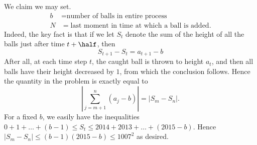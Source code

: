 \documentclass[11pt]{scrartcl}
\begin{document}
We claim we may set.
\begin{align*}
  b &= \text{number of balls in entire process} \\
  N &= \text{last moment in time at which a ball is added}.
\end{align*}
Indeed, the key fact is that if we let $S_t$ denote
the sum of the height of all the balls just after time $t+\half$, then
\[ S_{t+1} - S_t = a_{t+1} - b \]
After all, at each time step $t$, the caught ball is thrown to height $a_t$,
and then all balls have their height decreased by $1$,
from which the conclusion follows.
Hence the quantity in the problem is exactly equal to
\[ \left\lvert\sum_{j=m+1}^n (a_j-b) \right\rvert
  = \left\lvert S_m - S_n \right\rvert. \]
For a fixed $b$, we easily have the inequalities
$0 + 1 + \dots + (b-1) \le S_t \le 2014 + 2013 + \dots + (2015-b)$.
Hence $|S_m - S_n| \le (b-1)(2015-b) \le 1007^2$ as desired.
\pagebreak
\end{document}
